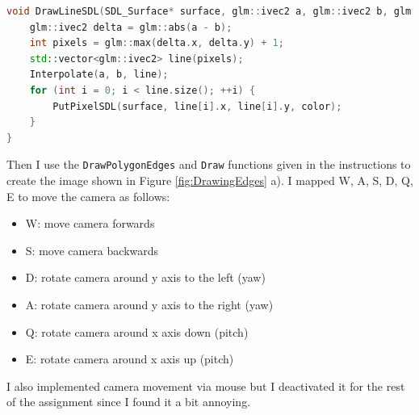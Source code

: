 \begin{lstlisting}[language=C++]
void DrawLineSDL(SDL_Surface* surface, glm::ivec2 a, glm::ivec2 b, glm::vec3 color) {
    glm::ivec2 delta = glm::abs(a - b);
    int pixels = glm::max(delta.x, delta.y) + 1;
    std::vector<glm::ivec2> line(pixels);
    Interpolate(a, b, line);
    for (int i = 0; i < line.size(); ++i) {
        PutPixelSDL(surface, line[i].x, line[i].y, color);
    }
}
\end{lstlisting}
Then I use the \texttt{DrawPolygonEdges} and \texttt{Draw} functions given in the instructions to 
create the image shown in Figure \ref{fig:DrawingEdges} a).
I mapped W, A, S, D, Q, E to move the camera as follows:
\begin{itemize}
    \item W: move camera forwards
    \item S: move camera backwards
    \item D: rotate camera around y axis to the left (yaw)
    \item A: rotate camera around y axis to the right (yaw)
    \item Q: rotate camera around x axis down (pitch)
    \item E: rotate camera around x axis up (pitch)
\end{itemize}
I also implemented camera movement via mouse but I deactivated it for the rest of the assignment
since I found it a bit annoying.


